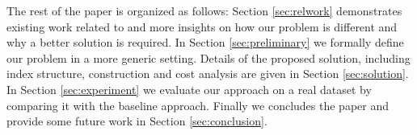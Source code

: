 The rest of the paper is organized as follows: Section \ref{sec:relwork} demonstrates existing work related to {\rrp} and more insights on how our problem is different and why a better solution is required. In Section \ref{sec:preliminary} we formally define our problem in a more generic setting. Details of the proposed solution, including index structure, construction and cost analysis are given in Section \ref{sec:solution}. In Section \ref{sec:experiment} we evaluate our approach on a real dataset by comparing it with the baseline approach. Finally we concludes the paper and provide some future work in Section \ref{sec:conclusion}.
